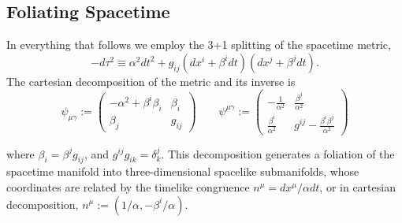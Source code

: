 \subsection{Foliating Spacetime}
\label{ssec:adm_metric}
In everything that follows we employ the 3+1 splitting of the spacetime metric,
\begin{equation}
  -d\tau^2 \equiv \alpha^2dt^2 + g_{ij}(dx^i+\beta^idt)(dx^j+\beta^jdt).
\end{equation}
The cartesian decomposition of the metric and its inverse is
\begin{equation}
  \psi_{\mu\gamma} :=
  \left(
  \begin{matrix}
    -\alpha^2 + \beta^i \beta_i  & \beta_i \\
    \beta_j                      & g_{ij}
  \end{matrix}
  \right)
  \qquad
  \psi^{\mu\gamma} :=
  \left(
  \begin{matrix}
    -\frac{1}{\alpha^2}          & \frac{\beta^j}{\alpha^2} \\
    \frac{\beta^i}{\alpha^2}     & g^{ij} - \frac{\beta^i \beta^j}{\alpha^2}
  \end{matrix}
  \right)
\end{equation}

where $\beta_i=\beta^j g_{ij}$, and $g^{ij}g_{ik}=\delta^{j}_{k}$.
This decomposition generates a foliation of the spacetime manifold into
three-dimensional spacelike submanifolds, whose coordinates are related
by the timelike congruence $n^\mu=dx^\mu/\alpha dt$, or in cartesian
decomposition, $n^\mu:=(1/\alpha,-\beta^i/\alpha)$.

